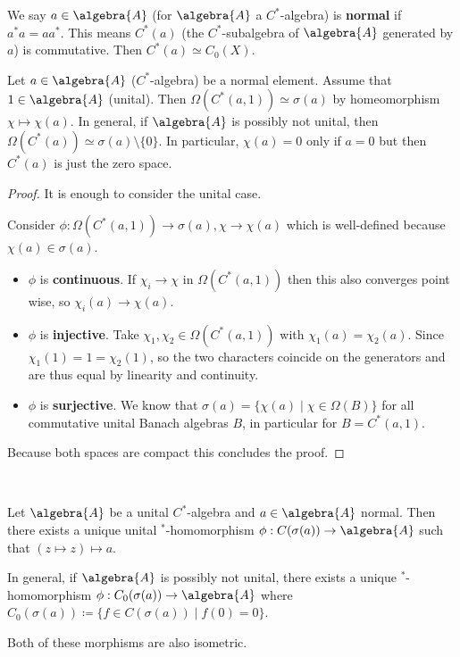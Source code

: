 \documentclass[a4paper]{article}
\begin{document}
\begin{definition}
	We say $a \in \algebra{A}$ (for $\algebra{A}$ a $C^*$-algebra) is \textbf{normal} if $a^* a = a a^*$.
	This means $C^*(a)$ (the $C^*$-subalgebra of $\algebra{A}$ generated by $a$) is commutative.
	Then $C^*(a) \simeq C_0(X)$.
\end{definition}

\begin{lemma}
	Let $a \in \algebra{A}$ ($C^*$-algebra) be a normal element.
	Assume that $1 \in \algebra{A}$ (unital).
	Then $\Omega(C^*(a,1)) \simeq \sigma(a)$ by homeomorphism $\chi \mapsto \chi(a)$.
	In general, if $\algebra{A}$ is possibly not unital, then $\Omega(C^*(a)) \simeq \sigma(a) \setminus \{0\}$.
	In particular, $\chi(a) = 0$ only if $a = 0$ but then $C^*(a)$ is just the zero space.
\end{lemma}

\begin{proof}
	It is enough to consider the unital case.

	Consider $\phi: \Omega(C^*(a,1)) \to \sigma(a), \chi \to \chi(a)$ which is well-defined because $\chi(a) \in \sigma(a)$.
	\begin{itemize}
		\item $\phi$ is \textbf{continuous}.
		If $\chi_i \to \chi$ in $\Omega(C^*(a,1))$ then this also converges point wise, so $\chi_i(a) \to \chi(a)$.
		\item $\phi$ is \textbf{injective}.
		Take $\chi_1, \chi_2 \in \Omega(C^*(a,1))$ with $\chi_1(a) = \chi_2(a)$.
		Since $\chi_1(1) = 1 = \chi_2(1)$, so the two characters coincide on the generators and are thus equal by linearity and continuity.
		\item $\phi$ is \textbf{surjective}. We know that $\sigma(a) = \{ \chi(a) \mid \chi \in \Omega(B)\}$ for all commutative unital Banach algebras $B$, in particular for $B = C^*(a,1)$.
	\end{itemize}
	Because both spaces are compact this concludes the proof.
\end{proof}

\begin{theorem}
	~

	Let $\algebra{A}$ be a unital $C^*$-algebra and $a \in \algebra{A}$ normal.
	Then there exists a unique unital $^*$-homomorphism $\phi: C(\sigma(a)) \to \algebra{A}$ such that $(z \mapsto z) \mapsto a$.

	In general, if $\algebra{A}$ is possibly not unital, there exists a unique $^*$-homomorphism $\phi: C_0(\sigma(a)) \to \algebra{A}$ where $C_0(\sigma(a)) \coloneq \{ f \in C(\sigma(a)) \mid f(0) = 0\}$.

	Both of these morphisms are also isometric.
\end{theorem}
\end{document}
